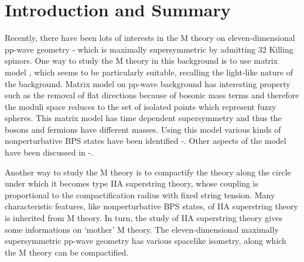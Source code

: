 \documentclass[a4paper,12pt]{article}
\begin{document}
\baselineskip 6.5mm
\renewcommand{\thefootnote}{\arabic{footnote}}
\setcounter{footnote}{0}


\section{Introduction and Summary}
Recently, there have been lots of interests in the M theory on 
eleven-dimensional 
pp-wave geometry \cite{kow194}-\cite{bla081} which is maximally supersymmetric 
by admitting 32 Killing
spinors. One way to study the M theory in this background is to use matrix
model \cite{ber021}, which seems to be particularly suitable, 
recalling the light-like nature 
of the background. Matrix model on pp-wave background
\cite{ber021,das185} has interesting property such as the removal of
flat directions because of bosonic mass terms and therefore the moduli
space reduces to the set of isolated points which represent fuzzy spheres.
This matrix model has time dependent supersymmetry and thus  the bosons and
fermions have different masses. 
Using this model various kinds of nonperturbative BPS 
states have been identified \cite{das185}-\cite{par161}. Other aspects of 
the model have been discussed in \cite{kim061}-\cite{mic204}. 

Another way to study the M theory is to compactify the theory along
the circle under which it becomes type IIA superstring theory, whose
coupling is proportional to the compactification radius with fixed
string tension.  Many characteristic features, like nonperturbative
BPS states, of IIA superstring theory is inherited from M theory. In
turn, the study of IIA superstring theory gives some informations on
`mother' M theory.  The eleven-dimensional maximally supersymmetric
pp-wave geometry has various spacelike isometry, along which the M
theory can be compactified\cite{mic140}.
\end{document}
